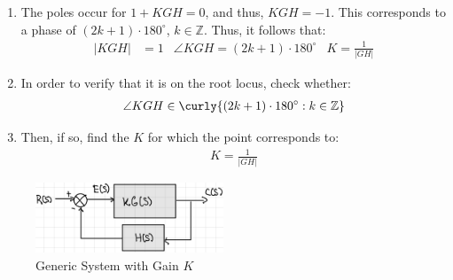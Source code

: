 \documentclass{article}
\begin{document}
\begin{enumerate}
\item The poles occur for $1 + KGH = 0$, and thus, $KGH = -1$. This corresponds to a phase of $(2k + 1)\cdot 180^\circ$, $k \in \mathbb{Z}$. Thus, it follows that:
  \begin{align*}
    |KGH| &= 1 & \angle KGH = (2k + 1)\cdot 180^\circ & K = \frac{1}{|GH|}
  \end{align*}
\item In order to verify that it is on the root locus, check whether:
  \begin{align*}
    \angle KGH \in \curly{(2k + 1) \cdot 180^\circ : k \in \mathbb{Z}}
  \end{align*}
\item Then, if so, find the $K$ for which the point corresponds to:
  \begin{align*}
    K = \frac{1}{|GH|}
  \end{align*}
\end{enumerate}

\begin{figure}[htbp]
  \centering
  \begin{center}
    \includegraphics[width=0.5\textwidth]{images/with_gain.png}
  \end{center}
  \caption{Generic System with Gain $K$}
  \label{fig:with-gain}
\end{figure}

\end{document}
